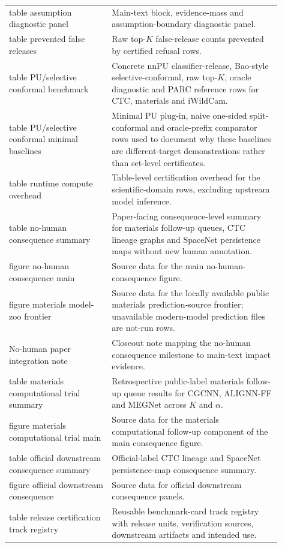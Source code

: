 \documentclass[11pt]{article}
\begin{document}
\begin{longtable}{p{0.34\linewidth}p{0.56\linewidth}}
table assumption diagnostic panel & Main-text block, evidence-mass and assumption-boundary diagnostic panel. \\
table prevented false releases & Raw top-\(K\) false-release counts prevented by certified refusal rows. \\
table PU/selective conformal benchmark & Concrete nnPU classifier-release, Bao-style selective-conformal, raw top-\(K\), oracle diagnostic and PARC reference rows for CTC, materials and iWildCam. \\
table PU/selective conformal minimal baselines & Minimal PU plug-in, naive one-sided split-conformal and oracle-prefix comparator rows used to document why these baselines are different-target demonstrations rather than set-level certificates. \\
table runtime compute overhead & Table-level certification overhead for the scientific-domain rows, excluding upstream model inference. \\
table no-human consequence summary & Paper-facing consequence-level summary for materials follow-up queues, CTC lineage graphs and SpaceNet persistence maps without new human annotation. \\
figure no-human consequence main & Source data for the main no-human-consequence figure. \\
figure materials model-zoo frontier & Source data for the locally available public materials prediction-source frontier; unavailable modern-model prediction files are not-run rows. \\
No-human paper integration note & Closeout note mapping the no-human consequence milestone to main-text impact evidence. \\
table materials computational trial summary & Retrospective public-label materials follow-up queue results for CGCNN, ALIGNN-FF and MEGNet across \(K\) and \(\alpha\). \\
figure materials computational trial main & Source data for the materials computational follow-up component of the main consequence figure. \\
table official downstream consequence summary & Official-label CTC lineage and SpaceNet persistence-map consequence summary. \\
figure official downstream consequence & Source data for official downstream consequence panels. \\
table release certification track registry & Reusable benchmark-card track registry with release units, verification sources, downstream artifacts and intended use. \\

\end{longtable}
\end{document}
